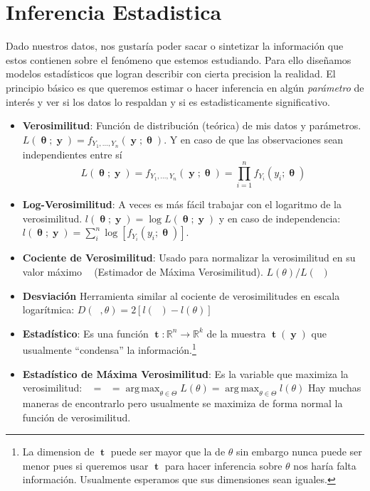 \documentclass[pdftex,11pt,a4paper]{article}
\DeclareMathOperator{\muestra}{\mathbf{y}}
\DeclareMathOperator{\param}{\mathbf{\theta}}
\DeclareMathOperator{\MLE}{\mathbf{\hat{\theta}}_{MLE}}
\DeclareMathOperator{\that}{\mathbf{\hat{\theta}}}
\DeclareMathOperator{\est}{\mathbf{t}}
\DeclareMathOperator*{\argmax}{arg\,max}
\begin{document}
\section{Inferencia Estadistica}
Dado nuestros datos, nos gustaría poder sacar o sintetizar la información que estos contienen sobre el fenómeno que estemos estudiando. Para ello diseñamos modelos estadísticos que logran describir con cierta precision la realidad. El principio básico es que queremos estimar o hacer inferencia en algún \emph{parámetro} de interés y ver si los datos lo respaldan y si es estadisticamente significativo.
\begin{itemize}
	\item \textbf{Verosimilitud}: Función de distribución (teórica) de mis datos y parámetros. $L(\param;\muestra) = f_{Y_1,\ldots,Y_n}(\muestra;\param)$. Y en caso de que las observaciones sean independientes entre sí $$L(\param;\muestra) = f_{Y_1,\ldots,Y_n}(\muestra;\param) = \prod_{i = 1}^n f_{Y_i}(y_i;\param)$$
	\item \textbf{Log-Verosimilitud}: A veces es más fácil trabajar con el logaritmo de la verosimilitud. \linebreak $l(\param;\muestra) = \log L(\param;\muestra)$ y en caso de independencia: $l(\param;\muestra) = \sum_i^n\log[f_{Y_i}(y_i;\param)]$.
	\item \textbf{Cociente de Verosimilitud}: Usado para normalizar la verosimilitud en su valor máximo $\MLE$ (Estimador de Máxima Verosimilitud). $L(\theta)/L(\that)$
	\item \textbf{Desviación} Herramienta similar al cociente de verosimilitudes en escala logarítmica: \linebreak $D(\that,\theta) = 2[l(\that)-l(\theta)]$
	\item \textbf{Estadístico}: Es una función $\est:\mathbb{R}^n \rightarrow \mathbb{R}^k$ de la muestra $\est(\muestra)$ que usualmente ``condensa'' la información.\footnote{La dimension de $\est$ puede ser mayor que la de $\theta$ sin embargo nunca puede ser menor pues si queremos usar $\est$ para hacer inferencia sobre $\theta$ nos haría falta información. Usualmente esperamos que sus dimensiones sean iguales.}
	\item \textbf{Estadístico de Máxima Verosimilitud}: Es la variable que maximiza la verosimilitud: $\MLE = \that = \argmax_{\theta \in  \Theta} L(\theta) = \argmax_{\theta \in  \Theta} l(\theta)$ Hay muchas maneras de encontrarlo pero usualmente se maximiza de forma normal la función de verosimilitud.
	\begin{itemize}

\end{itemize}
\end{itemize}
\end{document}
